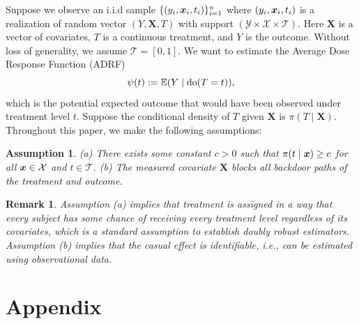 \documentclass{article} %
\def\X {\bm{X}}
\newtheorem{remark}{Remark}
\newtheorem{assump}{Assumption}
\begin{document}

Suppose we observe an i.i.d sample $\{(y_i,\boldsymbol{x}_i,t_i)\}_{i=1}^{n}$ where $(y_i,\boldsymbol{x}_i,t_i)$ is a realization of random vector $(Y,\X,T)$ with support $(\mathcal{Y}\times\mathcal{X}\times\mathcal{T})$. Here $\X$ is a vector of covariates, $T$ is a continuous treatment, and $Y$ is the outcome.  Without loss of generality, we assume $\mathcal{T}=[0,1]$.
We want to estimate the Average Dose Response Function (ADRF) 
\[
\psi(t):=\mathbb{E}(Y \mid \text{do}(T = t)),
\]
which is the potential expected outcome that would have been observed under treatment level $t$.
Suppose the conditional density of $T$ given $\X$ is $\pi(T\mid \X)$. 
Throughout this paper, we make the following assumptions:
\begin{assump}\label{assump}
(a) There exists some constant $c>0$ such that $\pi(t\mid \boldsymbol{x})\ge c$ for all $\boldsymbol{x}\in\mathcal{X}$ and $t\in\mathcal{T}$.
(b) The measured covariate $\X$ blocks all backdoor paths of the treatment and outcome.
\end{assump}

\begin{remark}
Assumption (a) implies that treatment is assigned in a way that every subject has some chance of receiving every treatment level regardless of its covariates, which is a standard assumption to establish doubly robust estimators. Assumption (b) implies that the casual effect is identifiable, i.e., can be estimated using observational data.
\end{remark}









\clearpage
\appendix
\section{Appendix}

\end{document}
